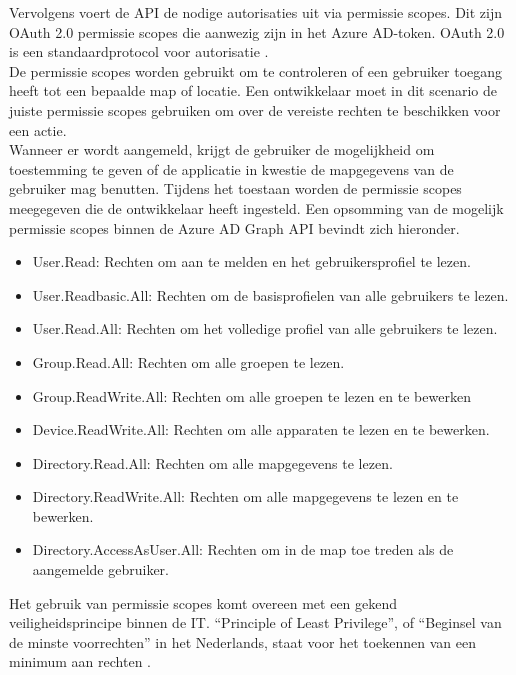 Vervolgens voert de \ac{API} de nodige autorisaties uit via permissie scopes. Dit zijn OAuth 2.0 permissie scopes die aanwezig zijn in het Azure \Ac{AD}-token. OAuth 2.0 is een standaardprotocol voor autorisatie \autocite{OAuth}. \\

De permissie scopes worden gebruikt om te controleren of een gebruiker toegang heeft tot een bepaalde map of locatie. Een ontwikkelaar moet in dit scenario de juiste permissie scopes gebruiken om over de vereiste rechten te beschikken voor een actie. \\

Wanneer er wordt aangemeld, krijgt de gebruiker de mogelijkheid om toestemming te geven of de applicatie in kwestie de mapgegevens van de gebruiker mag benutten. Tijdens het toestaan worden de permissie scopes meegegeven die de ontwikkelaar heeft ingesteld. Een opsomming van de mogelijk permissie scopes binnen de Azure \ac{AD} Graph \ac{API} bevindt zich hieronder. 

\begin{itemize}
    \item User.Read: Rechten om aan te melden en het gebruikersprofiel te lezen.
    \item User.Readbasic.All: Rechten om de basisprofielen van alle gebruikers te lezen.
    \item User.Read.All: Rechten om het volledige profiel van alle gebruikers te lezen.
    \item Group.Read.All: Rechten om alle groepen te lezen.
    \item Group.ReadWrite.All: Rechten om alle groepen te lezen en te bewerken
    \item Device.ReadWrite.All: Rechten om alle apparaten te lezen en te bewerken.
    \item Directory.Read.All: Rechten om alle mapgegevens te lezen.
    \item Directory.ReadWrite.All: Rechten om alle mapgegevens te lezen en te bewerken.
    \item Directory.AccessAsUser.All: Rechten om in de map toe treden als de aangemelde gebruiker.
\end{itemize}

Het gebruik van permissie scopes komt overeen met een gekend veiligheidsprincipe binnen de \ac{IT}. “Principle of Least Privilege”, of “Beginsel van de minste voorrechten” in het Nederlands, staat voor het toekennen van een minimum aan rechten \autocite{Saltzer1975}. 

